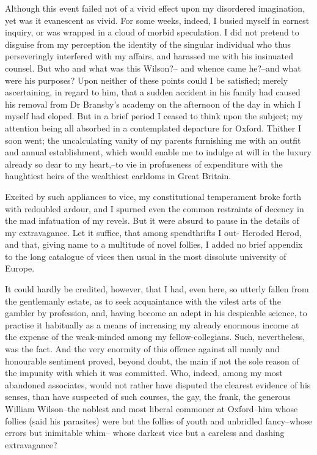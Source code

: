 \documentclass[12pt]{article}
\begin{document}
     Although this event failed not of a vivid effect upon my
disordered imagination, yet was it evanescent as vivid.  For some
weeks, indeed, I busied myself in earnest inquiry, or was wrapped
in a cloud of morbid speculation.  I did not pretend to disguise
from my perception the identity of the singular individual who thus
perseveringly interfered with my affairs, and harassed me 
with his insinuated counsel.  But who and what was this Wilson?--
and whence came he?--and what were his purposes?  Upon neither of
these points could I be satisfied; merely ascertaining, in regard
to him, that a sudden accident in his family had caused his removal
from Dr Bransby's academy on the afternoon of the day in which I
myself had eloped.  But in a brief period I ceased to think upon
the subject; my attention being all absorbed in a contemplated
departure for Oxford.  Thither I soon went; the uncalculating
vanity of my parents furnishing me with an outfit and annual
establishment, which would enable me to indulge at will in the
luxury already so dear to my heart,--to vie in profuseness of
expenditure with the haughtiest heirs of the wealthiest earldoms in
Great Britain.

     Excited by such appliances to vice, my constitutional
temperament broke forth with redoubled ardour, and I spurned even
the common restraints of decency in the mad infatuation of my
revels.  But it were absurd to pause in the details of my
extravagance.  Let it suffice, that among spendthrifts I out-
Heroded Herod, and that, giving name to a multitude of novel
follies, I added no brief appendix to the long catalogue of vices
then usual in the most dissolute university of Europe.

     It could hardly be credited, however, that I had, even here,
so utterly fallen from the gentlemanly estate, as to seek
acquaintance with the vilest arts of the gambler by profession,
and, having become an adept in his despicable science, to practise
it habitually as a means of increasing my already enormous income
at the expense of the weak-minded among my fellow-collegians. 
Such, nevertheless, was the fact.  And the very enormity of this
offence against all manly and honourable sentiment proved, beyond
doubt, the main if not the sole reason of the impunity with which
it was committed.  Who, indeed, among my most abandoned associates,
would not rather have disputed the clearest evidence of his senses,
than have suspected of such courses, the gay, the frank, the
generous William Wilson--the noblest and most liberal commoner at
Oxford--him whose follies (said his parasites) were but the follies
of youth and unbridled fancy--whose errors but inimitable whim--
whose darkest vice but a careless and dashing extravagance? 
\end{document}
